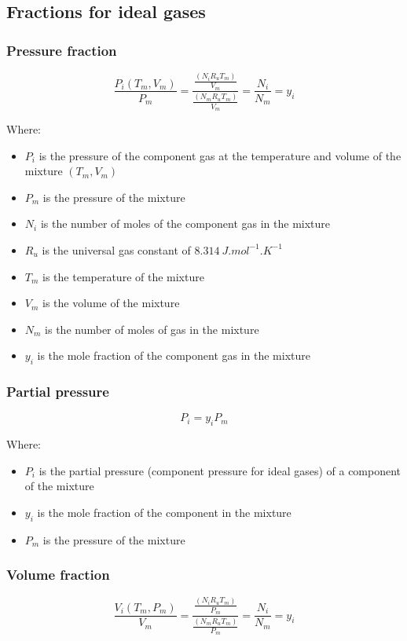 \documentclass[11pt]{article}
\begin{document}
\subsection{Fractions for ideal gases}
\label{sec:org7cf5283}

\subsubsection{Pressure fraction}
\label{sec:orgf97c9ce}
\[\frac{P_i(T_m, V_m)}{P_m} = \frac{\frac{(N_i R_u T_m)}{V_m}}{\frac{(N_m R_u T_m)}{V_m}} = \frac{N_i}{N_m} = y_i\]

Where:
\begin{itemize}
\item \(P_i\) is the pressure of the component gas at the temperature and volume of the mixture \((T_m, V_m)\)
\item \(P_m\) is the pressure of the mixture
\item \(N_i\) is the number of moles of the component gas in the mixture
\item \(R_u\) is the universal gas constant of \(\qty{8.314}{J.mol^{-1}.K^{-1}}\)
\item \(T_m\) is the temperature of the mixture
\item \(V_m\) is the volume of the mixture
\item \(N_m\) is the number of moles of gas in the mixture
\item \(y_i\) is the mole fraction of the component gas in the mixture
\end{itemize}

\subsubsection{Partial pressure}
\label{sec:org0c80e23}
\[P_i = y_i P_m\]

Where:
\begin{itemize}
\item \(P_i\) is the partial pressure (component pressure for ideal gases) of a component of the mixture
\item \(y_i\) is the mole fraction of the component in the mixture
\item \(P_m\) is the pressure of the mixture
\end{itemize}

\subsubsection{Volume fraction}
\label{sec:org4d3d4b5}
\[\frac{V_i(T_m, P_m)}{V_m} = \frac{\frac{(N_i R_u T_m)}{P_m}}{\frac{(N_m R_u T_m)}{P_m}} = \frac{N_i}{N_m} = y_i\]
\end{document}
